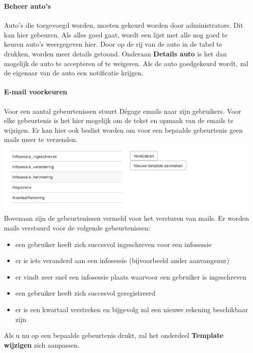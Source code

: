 \documentclass[11pt,a4paper,oneside]{article}
\begin{document}
{\large{\textbf{Beheer auto's}}} \\\\
Auto's die toegevoegd worden, moeten gekeurd worden door administrators. Dit kan hier gebeuren. Als alles goed gaat, wordt een lijst met alle nog goed te keuren auto's weergegeven hier. Door op de rij van de auto in de tabel te drukken, worden meer details getoond. Onderaan \textbf{Details auto} is het dan mogelijk de auto te accepteren of te weigeren. Als de auto goedgekeurd wordt, zal de eigenaar van de auto een notificatie krijgen.\\\\
{\large{\textbf{E-mail voorkeuren}}} \\\\
Voor een aantal gebeurtenissen stuurt D\'egage emails naar zijn gebruikers. Voor elke gebeurtenis is het hier mogelijk om de tekst en opmaak van de emails te wijzigen. Er kan hier ook beslist worden om voor een bepaalde gebeurtenis geen mails meer te verzenden. \\
\includegraphics{overzichttemplates}
Bovenaan zijn de gebeurtenissen vermeld voor het versturen van mails. Er worden mails verstuurd voor de volgende gebeurtenissen:
\begin{itemize}
\item een gebruiker heeft zich succesvol ingeschreven voor een infosessie
\item er is iets veranderd aan een infosessie (bijvoorbeeld ander aanvangsuur)
\item er vindt zeer snel een infosessie plaats waarvoor een gebruiker is ingeschreven
\item een gebruiker heeft zich succesvol geregistreerd
\item er is een kwartaal verstreken en bijgevolg zal een nieuwe rekening beschikbaar zijn
\end{itemize}
Als u nu op een bepaalde gebeurtenis drukt, zal het onderdeel \textbf{Template wijzigen} zich aanpassen. \\
\end{document}
